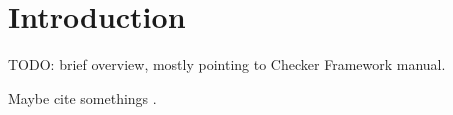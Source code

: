 \htmlhr
\chapter{Introduction\label{introduction}}

TODO: brief overview, mostly pointing to Checker Framework manual.

Maybe cite somethings
\cite{PapiACPE2008}.
